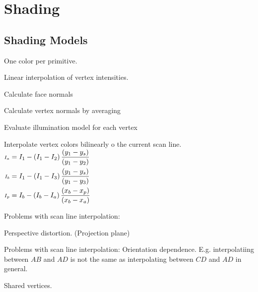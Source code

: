 \chapter{Shading}
\section{Shading Models}
\begin{compactdesc}
\item[\lp{Flat shading}] One color per primitive.
\item[\lp{Gouraud shading}] Linear interpolation of vertex intensities.\\
	\begin{enumerate*}[label=\protect\circled{\arabic*},itemjoin=,noitemsep,nosep]
		\item Calculate face normals\\
		\item Calculate vertex normals by averaging\\
		\item Evaluate illumination model for each vertex\\
		\item Interpolate vertex colors bilinearly o the current scan line.
			$
			\begin{aligned}\scriptstyle
				\scriptstyle I_a&=I_1-\left( I_1-I_2 \right)\frac{( y_1-y_s )}{( y_1-y_2 )}\scriptstyle\\
				\scriptstyle I_b&=I_1-\left( I_1-I_3 \right)\frac{( y_1-y_s )}{( y_1-y_3 )}\scriptstyle\\
				\scriptstyle I_p&=I_b-\left( I_b-I_a \right)\frac{( x_b-x_p )}{( x_b-x_a )}\scriptstyle
			\end{aligned}
			$
				\end{enumerate*}
				Problems with scan line interpolation: \\
				\begin{enumerate*}[label=\protect\circled{\arabic*},itemjoin=]
					\item Perspective distortion. (Projection plane)\\
					\item Problems with scan line interpolation: Orientation dependence. E.g. interpolatiing between $AB$ and $AD$ is not the same as interpolating between $CD$ and $AD$ in general.\\
					\item Shared vertices.

\end{enumerate*}
\end{compactdesc}
